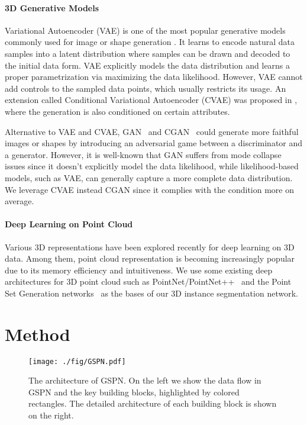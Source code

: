 \documentclass[10pt,twocolumn,letterpaper]{article}
\begin{document}
\paragraph{3D Generative Models}
Variational Autoencoder (VAE) \cite{kingma2013auto} is one of the most popular generative models commonly used for image or shape generation \cite{gulrajani2016pixelvae, nash2017shape}. It learns to encode natural data samples  into a latent distribution where samples can be drawn and decoded to the initial data form. VAE explicitly models the data distribution and learns a proper parametrization via maximizing the data likelihood. However, VAE cannot add controls to the sampled data points, which usually restricts its usage. An extension called Conditional Variational Autoencoder (CVAE) was proposed in \cite{sohn2015learning}, where the generation is also conditioned on certain attributes. 





Alternative to VAE and CVAE, GAN~\cite{goodfellow2014generative} and CGAN~\cite{mirza2014conditional} could generate more faithful images or shapes by introducing an adversarial game between a discriminator and a generator. However, it is well-known that GAN suffers from mode collapse issues since it doesn't explicitly model the data likelihood, while likelihood-based models, such as VAE, can generally capture a more complete data distribution. We leverage CVAE instead CGAN since it complies with the condition more on average.

\vspace{-\baselineskip}
\paragraph{Deep Learning on Point Cloud}
Various 3D representations \cite{su2015multi, wu20153d, riegler2017octnet, yi2017syncspeccnn, qi2017pointnet, qi2017pointnet++, fan2017point} have been explored recently for deep learning on 3D data. Among them, point cloud representation is becoming increasingly popular due to its memory efficiency and intuitiveness. We use some existing deep architectures for 3D point cloud such as PointNet/PointNet++~\cite{qi2017pointnet,qi2017pointnet++} and the Point Set Generation networks~\cite{fan2017point} as the bases of our 3D instance segmentation network.


%
 
\section{Method}
\begin{figure*}[t!]
    \centering
    \texttt{[image: ./fig/GSPN.pdf]}
    \caption{The architecture of GSPN. On the left we show the data flow in GSPN and the key building blocks, highlighted by colored rectangles. The detailed architecture of each building block is shown on the right.}
    \label{fig:gspn}
    \vspace{-\baselineskip}
\end{figure*}
\end{document}
